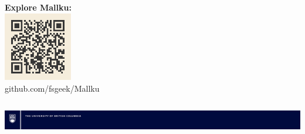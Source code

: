 \documentclass[final]{beamer}
\begin{document}
\begin{frame}[fragile]
\begin{columns}[t]
\begin{column}{0.32\textwidth}
        \vspace{1cm}
        \begin{center}
        \colorbox{mallkusky!30}{%
            \begin{minipage}{0.6\linewidth}
                \centering
                \large\textbf{Explore Mallku:}\\[0.5ex]
                \includegraphics[width=3cm]{mallku-qr-code.png}\\
                \footnotesize github.com/fsgeek/Mallku
            \end{minipage}
        }
        \end{center}

    \end{column}
\end{columns}

\vspace{\fill}

\hspace{-2cm}
\includegraphics[width=1.05\paperwidth]{ubc_research_poster_bar_desktop_publishing_package/ubc_posterbar_Blue.png}


\end{frame}
\end{document}
